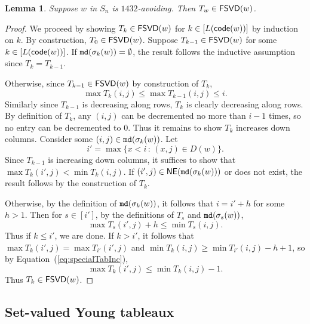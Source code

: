 \documentclass[12pt]{amsart}
\newtheorem{lemma}[theorem]{Lemma}
\theoremstyle{definition}
\theoremstyle{remark}
\numberwithin{equation}{section}
\newcommand \mdCR[1]{{\tt md}(#1)}
\newcommand{\code}{{\sf code}}
\newcommand{\FSVD}{{\sf FSVD}}
\newcommand{\NE}{{\sf NE}}
\newcommand{\Sym}{S}
\begin{document}
 
\begin{lemma}\label{lemma:1432FlagFill}
Suppose $w$ in $\Sym_n$ is $1432$-avoiding. Then $T_w\in \FSVD(w)$.
 \end{lemma}
 
\begin{proof}
We proceed by showing $T_{k}\in \FSVD(w)$ for $k\in[L(\code(w))]$ by induction on $k$.
By construction, $T_0\in \FSVD(w)$.
Suppose $T_{k-1}\in \FSVD(w)$ for some $k\in[L(\code(w))]$. If $\mdCR{\sigma_k(w)}=\emptyset$, the result follows the inductive assumption since $T_k=T_{k-1}$.



Otherwise, since $T_{k-1}\in \FSVD(w)$ by construction of $T_k$, 
\[\max T_k(i,j)\leq \max T_{k-1}(i,j)\leq i.\] 
Similarly since  
$T_{k-1}$ is decreasing along rows, $T_k$ is clearly decreasing along rows. 
By definition of $T_k$, any $(i,j)$ can be decremented no more than $i-1$ times, so no entry can be decremented to $0$.
Thus it remains to show $T_k$ increases down columns.
Consider some $(i,j)\in \mdCR{\sigma_k(w)}$. Let \[i'=\max\{x<i \,:  \, (x,j)\in D(w)\}.\]
Since $T_{k-1}$ is increasing down columns, it suffices to show that $\max T_{k}(i',j)<\min T_{k}(i,j)$. If $(i',j)\in \NE(\mdCR{\sigma_k(w)})$ or does not exist, the result follows by the construction of $T_k$. 


 Otherwise, by the definition of $\mdCR{\sigma_k(w)}$, it follows that $i=i'+h$ for some $h>1$. Then for $s\in[i']$, by the definitions of $T_{s}$ and $\mdCR{\sigma_s(w)}$,
\begin{equation}\label{eq:specialTabInc}
\max T_s(i',j)+h\leq\min T_s(i,j).
\end{equation}
Thus if $k\leq i'$, we are done. 
If $k>i'$, it follows that $\max T_{k}(i',j)=\max T_{i'}(i',j)$ and $\min T_{k}(i,j)\geq \min T_{i'}(i,j)-{h+1}$,
so by Equation~(\ref{eq:specialTabInc}), 
\[\max T_k(i',j)\leq\min T_k(i,j)-1.\]
 Thus $T_{k}\in \FSVD(w)$.
\end{proof} 
 
 

\subsection{Set-valued Young tableaux}
\end{document}
